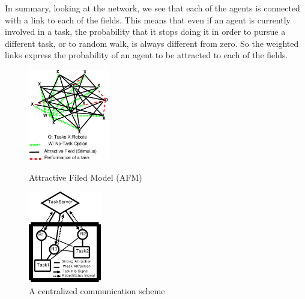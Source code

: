 \documentclass{llncs}
\begin{document}
In summary, looking at the network, we see that each of the agents is connected with a link to each of the fields. This means that even if an agent is currently involved in a task, the probability that it stops doing it in order to pursue a different task, or to random walk, is always different from zero. So the weighted links express the probability of an agent to be attracted to each of the fields.
\begin{figure}
\begin{minipage}[t]{0.48\linewidth}
\centering
\includegraphics[height=4cm, angle=0]{./images/AFM-Diag2.eps}
\caption{\small Attractive Filed Model (AFM)}
\label{fig:afm} %
\end{minipage}
\hspace{0.5cm}
\begin{minipage}[t]{0.48\linewidth}
\centering
\includegraphics[height=4cm, angle=0]{./images/CentralizedComm.eps}
\caption{\small A centralized communication scheme} %
\label{fig:ccm} %
\end{minipage}
\end{figure}
\end{document}
